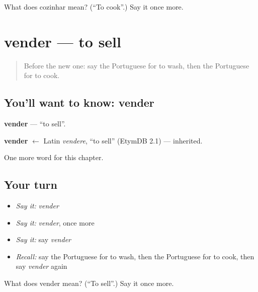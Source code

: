 \begin{tcolorbox}[breakable,colback=teal!4,colframe=teal!35!black,title={Before you move on}]
What does cozinhar mean? (\textquotedblleft{}To cook\textquotedblright{}.) Say it once more.
\end{tcolorbox}
\section[vender]{vender — to sell}

\label{lesson:PT-C41-vender}



\begin{quote}
Before the new one: say the Portuguese for to wash, then the Portuguese for to cook.
\end{quote}

\subsection*{You'll want to know: vender}
\textbf{vender} — \textquotedblleft{}to sell\textquotedblright{}.

\begin{cousinweb}
\textbf{vender} $\leftarrow$ Latin \emph{vendere}, \textquotedblleft{}to sell\textquotedblright{} (EtymDB 2.1) — inherited.
\end{cousinweb}

\begin{grammarlens}[title={What you've built}]
One more word for this chapter.
\end{grammarlens}

\subsection*{Your turn}
\begin{itemize}
\raggedright
  \item \emph{Say it:} \emph{vender}
  \item \emph{Say it:} \emph{vender}, once more
  \item \emph{Say it:} say \emph{vender}
  \item \emph{Recall:} say the Portuguese for to wash, then the Portuguese for to cook, then say \emph{vender} again
\end{itemize}

\begin{tcolorbox}[breakable,colback=teal!4,colframe=teal!35!black,title={Before you move on}]
What does vender mean? (\textquotedblleft{}To sell\textquotedblright{}.) Say it once more.
\end{tcolorbox}
